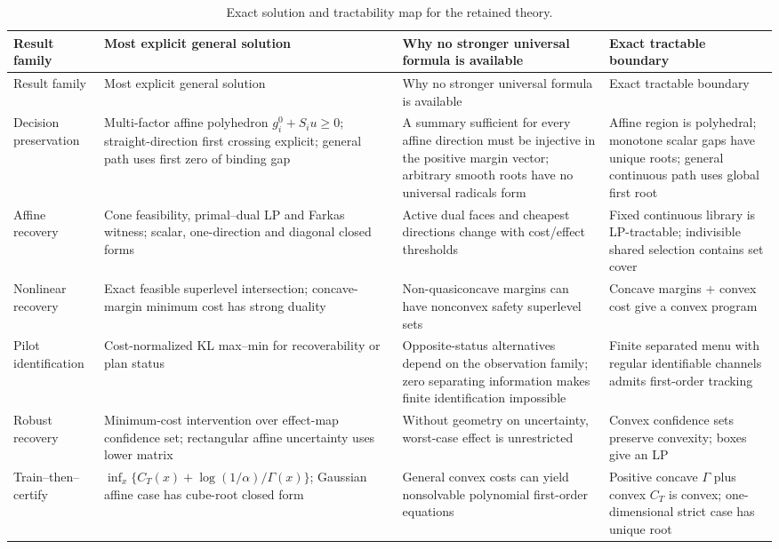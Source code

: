 \documentclass[11pt,letterpaper]{article}
\theoremstyle{plain}
\newcommand{\1}{\mathbf 1}
\begin{document}
\begingroup\scriptsize
\begin{longtable}{p{}p{}p{}p{}}
\caption{Exact solution and tractability map for the retained theory.}\label{tab:s_tractability}\\
\toprule
Result family & Most explicit general solution & Why no stronger universal formula is available & Exact tractable boundary\\
\midrule\endfirsthead
\toprule
Result family & Most explicit general solution & Why no stronger universal formula is available & Exact tractable boundary\\
\midrule\endhead
Decision preservation & Multi-factor affine polyhedron $g_i^0+S_iu\ge0$; straight-direction first crossing explicit; general path uses first zero of binding gap & A summary sufficient for every affine direction must be injective in the positive margin vector; arbitrary smooth roots have no universal radicals form & Affine region is polyhedral; monotone scalar gaps have unique roots; general continuous path uses global first root\\
Affine recovery & Cone feasibility, primal--dual LP and Farkas witness; scalar, one-direction and diagonal closed forms & Active dual faces and cheapest directions change with cost/effect thresholds & Fixed continuous library is LP-tractable; indivisible shared selection contains set cover\\
Nonlinear recovery & Exact feasible superlevel intersection; concave-margin minimum cost has strong duality & Non-quasiconcave margins can have nonconvex safety superlevel sets & Concave margins + convex cost give a convex program\\
Pilot identification & Cost-normalized KL max--min for recoverability or plan status & Opposite-status alternatives depend on the observation family; zero separating information makes finite identification impossible & Finite separated menu with regular identifiable channels admits first-order tracking\\
Robust recovery & Minimum-cost intervention over effect-map confidence set; rectangular affine uncertainty uses lower matrix & Without geometry on uncertainty, worst-case effect is unrestricted & Convex confidence sets preserve convexity; boxes give an LP\\
Train--then--certify & $\inf_x\{C_T(x)+\log(1/\alpha)/\Gamma(x)\}$; Gaussian affine case has cube-root closed form & General convex costs can yield nonsolvable polynomial first-order equations & Positive concave $\Gamma$ plus convex $C_T$ is convex; one-dimensional strict case has unique root\\

\end{longtable}
\end{document}
